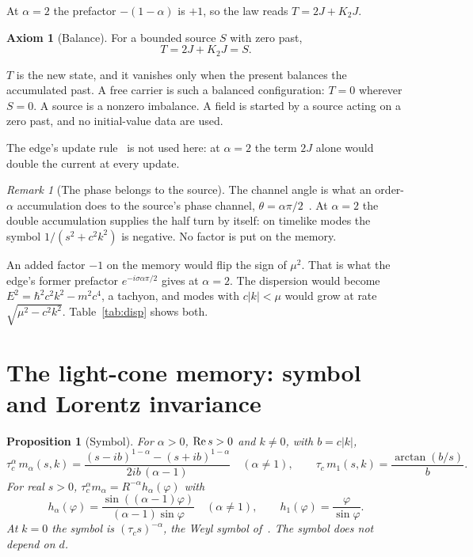\documentclass[11pt]{amsart}
\newtheorem{proposition}[theorem]{Proposition}
\theoremstyle{definition}
\newtheorem{axiom}{Axiom}
\theoremstyle{remark}
\newtheorem{remark}[theorem]{Remark}
\begin{document}
At $\alpha=2$ the prefactor $-(1-\alpha)$ is $+1$, so the law reads $T=2J+K_2J$.

\begin{axiom}[Balance]\label{ax:FE}
For a bounded source $S$ with zero past,
\begin{equation}\label{eq:FE}
T=2J+K_2J=S .
\end{equation}
\end{axiom}

$T$ is the new state, and it vanishes only when the present balances the accumulated past. A free carrier is such a balanced configuration: $T=0$ wherever $S=0$. A source is a nonzero imbalance. A field is started by a source acting on a zero past, and no initial-value data are used.

The edge's update rule~\cite[Axiom~3]{Edge} is not used here: at $\alpha=2$ the term $2J$ alone would double the current at every update.

\begin{remark}[The phase belongs to the source]\label{rem:phase}
The channel angle is what an order-$\alpha$ accumulation does to the source's phase channel, $\theta=\alpha\pi/2$~\cite[Axiom~2]{Edge}. At $\alpha=2$ the double accumulation supplies the half turn by itself: on timelike modes the symbol $1/(s^2+c^2k^2)$ is negative. No factor is put on the memory.

An added factor $-1$ on the memory would flip the sign of $\mu^2$. That is what the edge's former prefactor $e^{-i\sigma\alpha\pi/2}$ gives at $\alpha=2$. The dispersion would become $E^2=\hbar^2c^2k^2-m^2c^4$, a tachyon, and modes with $c\lvert k\rvert<\mu$ would grow at rate $\sqrt{\mu^2-c^2k^2}$. Table~\ref{tab:disp} shows both.
\end{remark}

\section{The light-cone memory: symbol and Lorentz invariance}

\begin{proposition}[Symbol]\label{prop:symbol}
For $\alpha>0$, ${\rm Re}\,s>0$ and $k\ne0$, with $b=c\lvert k\rvert$,
\[
\tau_c^{\alpha}\,m_\alpha(s,k)=\frac{(s-ib)^{1-\alpha}-(s+ib)^{1-\alpha}}{2ib\,(\alpha-1)}\quad(\alpha\ne1),\qquad
\tau_c\,m_1(s,k)=\frac{\arctan(b/s)}{b}.
\]
For real $s>0$, $\tau_c^\alpha m_\alpha=R^{-\alpha}h_\alpha(\varphi)$ with
\[
h_\alpha(\varphi)=\frac{\sin((\alpha-1)\varphi)}{(\alpha-1)\sin\varphi}\quad(\alpha\ne1),\qquad h_1(\varphi)=\frac{\varphi}{\sin\varphi}.
\]
At $k=0$ the symbol is $(\tau_cs)^{-\alpha}$, the Weyl symbol of~\cite[Def.~2.1]{Edge}. The symbol does not depend on $d$.
\end{proposition}
\end{document}
